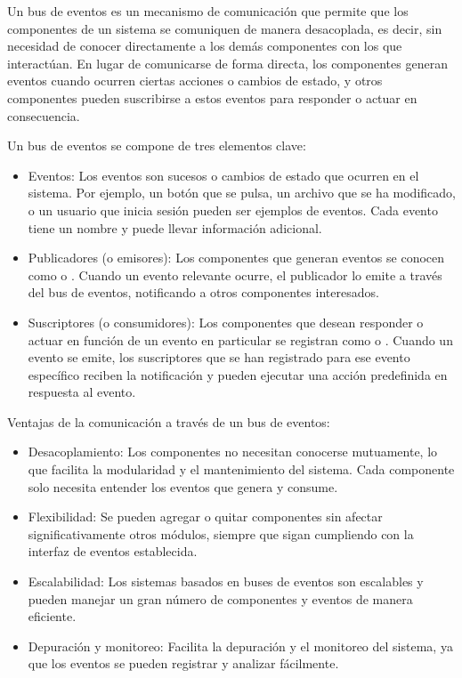 Un bus de eventos es un mecanismo de comunicación que permite que los componentes de un sistema se comuniquen de manera desacoplada, es decir, sin necesidad de conocer directamente a los demás componentes con los que interactúan. En lugar de comunicarse de forma directa, los componentes generan eventos cuando ocurren ciertas acciones o cambios de estado, y otros componentes pueden suscribirse a estos eventos para responder o actuar en consecuencia.

Un bus de eventos se compone de tres elementos clave:
\begin{itemize}
    \item Eventos: Los eventos son sucesos o cambios de estado que ocurren en el sistema. Por ejemplo, un botón que se pulsa, un archivo que se ha modificado, o un usuario que inicia sesión pueden ser ejemplos de eventos. Cada evento tiene un nombre y puede llevar información adicional.
    \item Publicadores (o emisores): Los componentes que generan eventos se conocen como  o . Cuando un evento relevante ocurre, el publicador lo emite a través del bus de eventos, notificando a otros componentes interesados.
    \item Suscriptores (o consumidores): Los componentes que desean responder o actuar en función de un evento en particular se registran como  o . Cuando un evento se emite, los suscriptores que se han registrado para ese evento específico reciben la notificación y pueden ejecutar una acción predefinida en respuesta al evento.
\end{itemize}

Ventajas de la comunicación a través de un bus de eventos:
\begin{itemize}
    \item Desacoplamiento: Los componentes no necesitan conocerse mutuamente, lo que facilita la modularidad y el mantenimiento del sistema. Cada componente solo necesita entender los eventos que genera y consume.
    \item Flexibilidad: Se pueden agregar o quitar componentes sin afectar significativamente otros módulos, siempre que sigan cumpliendo con la interfaz de eventos establecida.
    \item Escalabilidad: Los sistemas basados en buses de eventos son escalables y pueden manejar un gran número de componentes y eventos de manera eficiente.
    \item Depuración y monitoreo: Facilita la depuración y el monitoreo del sistema, ya que los eventos se pueden registrar y analizar fácilmente.
\end{itemize}



